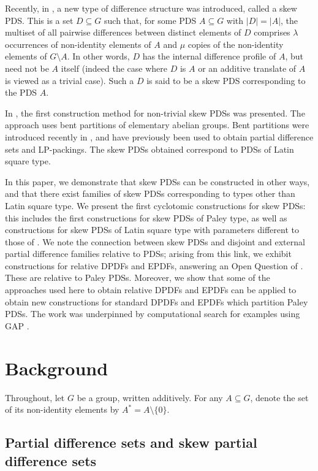 \documentclass[12pt, a4paper]{article}
\theoremstyle{definition}
\begin{document}
Recently, in \cite{AnbKalMei}, a new type of difference structure was introduced, called a skew PDS.  This is a set $D \subseteq G$ such that, for some PDS $A \subseteq G$ with $|D|=|A|$, the multiset of all pairwise differences between distinct elements of $D$ comprises $\lambda$ occurrences of non-identity elements of $A$ and $\mu$ copies of the non-identity elements of $G \setminus A$.  In other words, $D$ has the internal difference profile of $A$, but need not be $A$ itself (indeed the case where $D$ is $A$ or an additive translate of $A$ is viewed as a trivial case).  Such a $D$ is said to be a skew PDS corresponding to the PDS $A$.

In \cite{AnbKalMei}, the first construction method for non-trivial skew PDSs was presented.  The approach uses bent partitions of elementary abelian groups.  Bent partitions were introduced recently in \cite{AnbMei}, and have previously been used to obtain partial difference sets and LP-packings.  The skew PDSs obtained correspond to PDSs of Latin square type.

In this paper, we demonstrate that skew PDSs can be constructed in other ways, and that there exist families of skew PDSs corresponding to types other than Latin square type.  We present the first cyclotomic constructions for skew PDSs: this includes the first constructions for skew PDSs of Paley type, as well as constructions for skew PDSs of Latin square type with parameters different to those of \cite{AnbKalMei}.  We note the connection between skew PDSs and disjoint and external partial difference families relative to PDSs; arising from this link, we exhibit constructions for relative DPDFs and EPDFs, answering an Open Question of \cite{HucJoh}.  These are relative to Paley PDSs. Moreover, we show that some of the approaches used here to obtain relative DPDFs and EPDFs can be applied to obtain new constructions for standard DPDFs and EPDFs which partition Paley PDSs. The work was underpinned by computational search for examples using GAP \cite{GAP4}.

\section{Background}

Throughout, let $G$ be a group, written additively.  For any $A \subseteq G$, denote the set of its non-identity elements by $A^*=A \setminus \{0\}$.

\subsection{Partial difference sets and skew partial difference sets}
\end{document}
